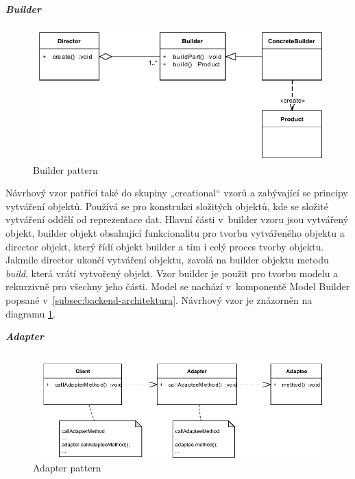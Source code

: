 \documentclass[11pt,twoside,a4paper]{book}
\begin{document}
\textbf{\textit{Builder}}

\begin{figure}[h]
\begin{center}
\includegraphics[width=13cm]{images-pdf/BuilderDesignPattern.pdf}
\caption{Builder pattern}
\label{fig:builder-pattern}
\end{center}
\end{figure}

Návrhový vzor patřící také do skupiny „creational“ vzorů a zabývající se
principy vytváření objektů. Používá se pro konstrukci složitých objektů, kde se
složité vytváření oddělí od reprezentace dat. Hlavní části v~builder vzoru jsou
vytvářený objekt, builder objekt obsahující funkcionalitu pro tvorbu vytvářeného
objektu a director objekt, který řídí objekt builder a tím i celý proces tvorby
objektu. Jakmile director ukončí vytváření objektu, zavolá na builder objektu
metodu {\em build}, která vrátí vytvořený objekt. Vzor builder je použit pro
tvorbu modelu a rekurzivně pro všechny jeho části.
Model se nachází v~komponentě Model Builder popsané
v~\ref{subsec:backend-architektura}. Návrhový vzor je znázorněn na diagramu
\ref{fig:builder-pattern}.

\textbf{\textit{Adapter}}

\begin{figure}[h]
\begin{center}
\includegraphics[width=13cm]{images-pdf/AdapterDesignPattern.pdf}
\caption{Adapter pattern}
\label{fig:adapter-pattern}
\end{center}
\end{figure}
\end{document}

